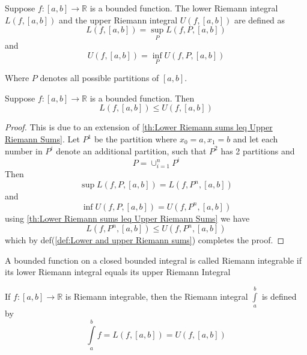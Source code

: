 \begin{defn}
    Suppose $ f: [a,b] \to \mathbb{R} $ is a bounded function. The lower Riemann integral
    $ L\left( f, [a,b] \right) $ and the upper Riemann integral $ U\left( f, [a,b]\right)
    $ are defined as 
    \[
     L\left( f, [a,b] \right) = \sup_P  L\left( f, P, [a,b] \right)  
    \]
    and 
    \[
     U\left( f, [a,b] \right) = \inf_P  U\left( f, P, [a,b] \right)  
    \]
    \label{def:Lower and upper Riemann integrals}
\end{defn}
Where $ P $ denotes all possible partitions of $ [a,b] $. 
\begin{ftheo}
    Suppose $ f : [a,b] \to \mathbb{R}  $ is a bounded function. Then 
    \[
    L\left( f, [a,b] \right) \leq U\left( f, [a,b] \right)  
    \]
    \label{th:Lower Riemann Integral leq Upper Riemann Integral }
\end{ftheo}
\begin{proof}
    This is due to an extension of \ref{th:Lower Riemann sums leq Upper Riemann Sums}. 
    Let $ P^1 $ be the partition where $ x_0 = a, x_1 = b $ and let each number in $ P^i $ denote
    an additional partition, such that $ P^2 $ has 2 partitions and 
    \[
        P = \cup_{i=1}^{n} P^i
    \]
    Then 
    \[
        \sup L\left( f, P, [a,b] \right) = L\left( f, P^n, [a,b] \right)
    \]
    and 
    \[
        \inf U\left( f, P, [a,b] \right) = U\left( f, P^n, [a,b] \right)
    \] 
    using \ref{th:Lower Riemann sums leq Upper Riemann Sums} we have 
    \[
    L\left( f, P^n, [a,b] \right) \leq U\left( f, P^n, [a,b] \right) 
    \]
    which by def(\ref{def:Lower and upper Riemann sums}) completes the proof.   
\end{proof}
\begin{defn}
    A bounded function on a closed bounded integral is called Riemann integrable if its
    lower Riemann integral equals its upper Riemann Integral 
    \label{def:Riemann integrable}
\end{defn}

\begin{defn}
    If $ f:[a,b] \to \mathbb{R} $ is Riemann integrable, then the Riemann integral 
    $ \int\limits_{a}^{b}  $ is defined by 
    \[
        \int\limits_{a}^{b} f = L\left( f, [a,b]\right) = U\left( f, [a,b]\right) 
    \]
    \label{def:Riemann integral}
\end{defn}

